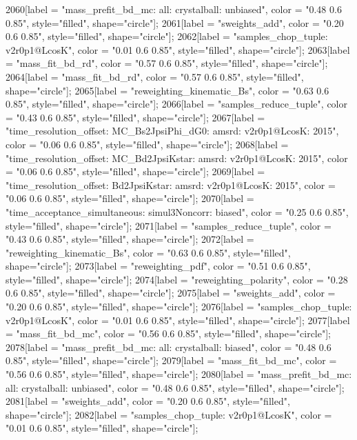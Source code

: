{	2060[label = "mass_prefit_bd_mc\nmassbin: all\nmassmodel: crystalball\ntrigger: unbiased", color = "0.48 0.6 0.85", style="filled", shape="circle"];
	2061[label = "sweights_add", color = "0.20 0.6 0.85", style="filled", shape="circle"];
	2062[label = "samples_chop_tuple\nversion: v2r0p1@LcosK", color = "0.01 0.6 0.85", style="filled", shape="circle"];
	2063[label = "mass_fit_bd_rd", color = "0.57 0.6 0.85", style="filled", shape="circle"];
	2064[label = "mass_fit_bd_rd", color = "0.57 0.6 0.85", style="filled", shape="circle"];
	2065[label = "reweighting_kinematic_Bs", color = "0.63 0.6 0.85", style="filled", shape="circle"];
	2066[label = "samples_reduce_tuple", color = "0.43 0.6 0.85", style="filled", shape="circle"];
	2067[label = "time_resolution_offset\nmode: MC_Bs2JpsiPhi_dG0\ntimeres: amsrd\nversion: v2r0p1@LcosK\nyear: 2015", color = "0.06 0.6 0.85", style="filled", shape="circle"];
	2068[label = "time_resolution_offset\nmode: MC_Bd2JpsiKstar\ntimeres: amsrd\nversion: v2r0p1@LcosK\nyear: 2015", color = "0.06 0.6 0.85", style="filled", shape="circle"];
	2069[label = "time_resolution_offset\nmode: Bd2JpsiKstar\ntimeres: amsrd\nversion: v2r0p1@LcosK\nyear: 2015", color = "0.06 0.6 0.85", style="filled", shape="circle"];
	2070[label = "time_acceptance_simultaneous\ntimeacc: simul3Noncorr\ntrigger: biased", color = "0.25 0.6 0.85", style="filled", shape="circle"];
	2071[label = "samples_reduce_tuple", color = "0.43 0.6 0.85", style="filled", shape="circle"];
	2072[label = "reweighting_kinematic_Bs", color = "0.63 0.6 0.85", style="filled", shape="circle"];
	2073[label = "reweighting_pdf", color = "0.51 0.6 0.85", style="filled", shape="circle"];
	2074[label = "reweighting_polarity", color = "0.28 0.6 0.85", style="filled", shape="circle"];
	2075[label = "sweights_add", color = "0.20 0.6 0.85", style="filled", shape="circle"];
	2076[label = "samples_chop_tuple\nversion: v2r0p1@LcosK", color = "0.01 0.6 0.85", style="filled", shape="circle"];
	2077[label = "mass_fit_bd_mc", color = "0.56 0.6 0.85", style="filled", shape="circle"];
	2078[label = "mass_prefit_bd_mc\nmassbin: all\nmassmodel: crystalball\ntrigger: biased", color = "0.48 0.6 0.85", style="filled", shape="circle"];
	2079[label = "mass_fit_bd_mc", color = "0.56 0.6 0.85", style="filled", shape="circle"];
	2080[label = "mass_prefit_bd_mc\nmassbin: all\nmassmodel: crystalball\ntrigger: unbiased", color = "0.48 0.6 0.85", style="filled", shape="circle"];
	2081[label = "sweights_add", color = "0.20 0.6 0.85", style="filled", shape="circle"];
	2082[label = "samples_chop_tuple\nversion: v2r0p1@LcosK", color = "0.01 0.6 0.85", style="filled", shape="circle"];
}
